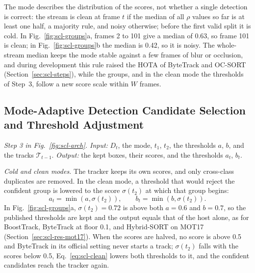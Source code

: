 The mode describes the distribution of the scores, not whether a single detection is correct: the stream is clean at frame $t$ if the median of all $\rho$ values so far is at least one half, a majority rule, and noisy otherwise; before the first valid split it is cold. In Fig.~\ref{fig:scl-groups}a, frames 2 to 101 give a median of 0.63, so frame 101 is clean; in Fig.~\ref{fig:scl-groups}b the median is 0.42, so it is noisy. The whole-stream median keeps the mode stable against a few frames of blur or occlusion, and during development this rule raised the HOTA of ByteTrack and OC-SORT (Section~\ref{sec:scl-steps}), while the groups, and in the clean mode the thresholds of Step~3, follow a new score scale within $W$ frames.

\subsection{Mode-Adaptive Detection Candidate Selection and Threshold Adjustment}\label{sec:scl-modes}
\emph{Step 3 in Fig.~\ref{fig:scl-arch}. Input:} $D_t$, the mode, $t_1$, $t_2$, the thresholds $a$, $b$, and the tracks $\mathcal{T}_{t-1}$. \emph{Output:} the kept boxes, their scores, and the thresholds $a_t$, $b_t$.

\emph{Cold and clean modes.} The tracker keeps its own scores, and only cross-class duplicates are removed. In the clean mode, a threshold that would reject the confident group is lowered to the score $\sigma(t_2)$ at which that group begins:
\begin{equation}
a_t=\min\!\left(a,\sigma(t_2)\right),\qquad b_t=\min\!\left(b,\sigma(t_2)\right).
\label{eq:scl-clean}
\end{equation}
In Fig.~\ref{fig:scl-groups}a, $\sigma(t_2)=0.72$ is above both $a=0.6$ and $b=0.7$, so the published thresholds are kept and the output equals that of the host alone, as for BoostTrack, ByteTrack at floor 0.1, and Hybrid-SORT on MOT17 (Section~\ref{sec:scl-res-mot17}). When the scores are halved, no score is above 0.5 and ByteTrack in its official setting never starts a track; $\sigma(t_2)$ falls with the scores below 0.5, Eq.~\eqref{eq:scl-clean} lowers both thresholds to it, and the confident candidates reach the tracker again.

